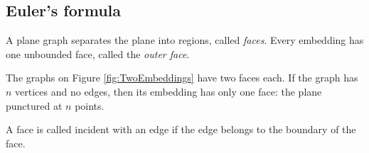 \subsection{Euler's formula}
A plane graph separates the plane into regions, called \emph{faces}.
Every embedding has one unbounded face, called the \emph{outer face}.

The graphs on Figure \ref{fig:TwoEmbeddings} have two faces each.
If the graph has $n$ vertices and no edges, then its embedding has only one face: the plane punctured at $n$ points.

A face is called incident with an edge if the edge belongs to the boundary of the face.